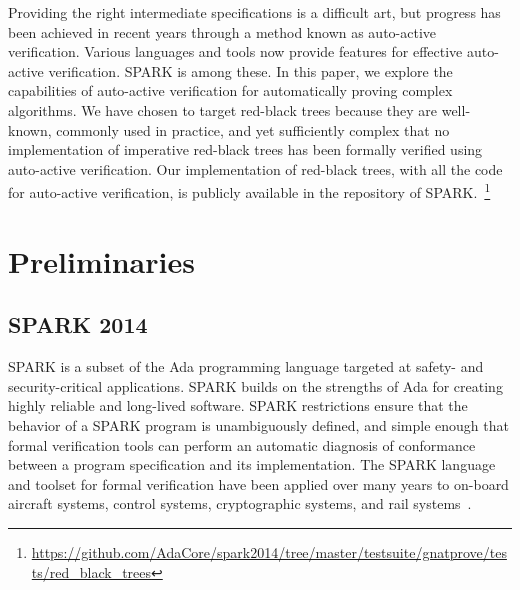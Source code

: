 \documentclass{llncs}
\newcommand{\spark}{SPARK\xspace}
\begin{document}
Providing the right intermediate specifications is a difficult art, but
progress has been achieved in recent years through a method known as
auto-active verification. Various languages and tools now provide
features for effective auto-active verification. SPARK is among
these. In this paper, we explore the capabilities of auto-active verification
for automatically proving complex algorithms. We have chosen to target
red-black trees because they are well-known, commonly used in practice, and yet
sufficiently complex that no implementation of imperative red-black trees has
been formally verified using auto-active verification. Our implementation of
red-black trees, with all the code for auto-active verification, is publicly
available in the repository of
SPARK.~\footnote{\url{https://github.com/AdaCore/spark2014/tree/master/testsuite/gnatprove/tests/red_black_trees}}




\section{Preliminaries}
\subsection{\spark 2014}

\spark is a subset of the Ada programming language targeted at safety-
and security-critical applications. \spark builds on the strengths of
Ada for creating highly reliable and long-lived software. \spark
restrictions ensure that the behavior of a \spark program is
unambiguously defined, and simple enough that formal verification
tools can perform an automatic diagnosis of conformance between a
program specification and its implementation. The \spark language and
toolset for formal verification have been applied over many years to
on-board aircraft systems, control systems, cryptographic systems, and
rail systems~\cite{oneill2012}.
\end{document}
